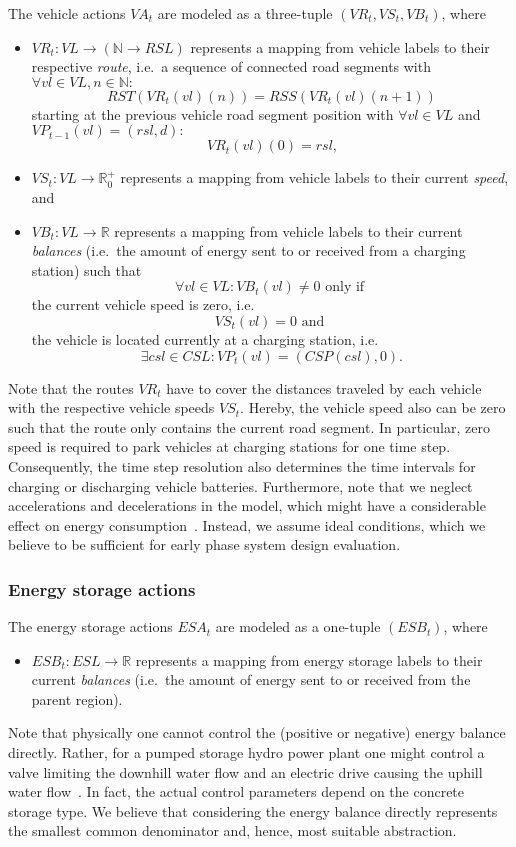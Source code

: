 The vehicle actions $VA_t$ are modeled as a three-tuple $(VR_t, VS_t, VB_t)$, where
\begin{itemize}
	\item $VR_t: VL \rightarrow (\mathbb{N} \rightarrow RSL)$ represents a mapping from vehicle labels to their respective \textit{route}, i.e.\ a sequence of connected road segments with $\forall vl \in VL, n \in \mathbb{N}:$
	\[
		RST(VR_t(vl)(n)) = RSS(VR_t(vl)(n + 1))
	\]
	starting at the previous vehicle road segment position with $\forall vl \in VL$ and $VP_{t-1}(vl) = (rsl, d):$
	\[
		VR_t(vl)(0) = rsl \textrm{,}
	\]
	\item $VS_t: VL \rightarrow \mathbb{R}_0^+$ represents a mapping from vehicle labels to their current \textit{speed}, and
	\item $VB_t: VL \rightarrow \mathbb{R}$ represents a mapping from vehicle labels to their current \textit{balances} (i.e.\ the amount of energy sent to or received from a charging station) such that
	\[
		\forall vl \in VL: VB_t(vl) \neq 0 \textrm{ only if }
	\]
	the current vehicle speed is zero, i.e.\
	\[
		 VS_t(vl) = 0 \textrm{ and }
	\]
	the vehicle is located currently at a charging station, i.e.\
	\[
		\exists csl \in CSL: VP_t(vl) = (CSP(csl), 0) \textrm{.}
	\]
\end{itemize}
Note that the routes $VR_t$ have to cover the distances traveled by each vehicle with the respective vehicle speeds $VS_t$. Hereby, the vehicle speed also can be zero such that the route only contains the current road segment. In particular, zero speed is required to park vehicles at charging stations for one time step. Consequently, the time step resolution also determines the time intervals for charging or discharging vehicle batteries. Furthermore, note that we neglect accelerations and decelerations in the model, which might have a considerable effect on energy consumption~\cite{?}. Instead, we assume ideal conditions, which we believe to be sufficient for early phase system design evaluation.

\subsubsection{Energy storage actions}
\label{actions_storages}

The energy storage actions $ESA_t$ are modeled as a one-tuple $(ESB_t)$, where
\begin{itemize}
	\item $ESB_t: ESL \rightarrow \mathbb{R}$ represents a mapping from energy storage labels to their current \textit{balances} (i.e.\ the amount of energy sent to or received from the parent region).
\end{itemize}
Note that physically one cannot control the (positive or negative) energy balance directly. Rather, for a pumped storage hydro power plant one might control a valve limiting the downhill water flow and an electric drive causing the uphill water flow~\cite{Castronuovo2004}. In fact, the actual control parameters depend on the concrete storage type. We believe that considering the energy balance directly represents the smallest common denominator and, hence, most suitable abstraction.

